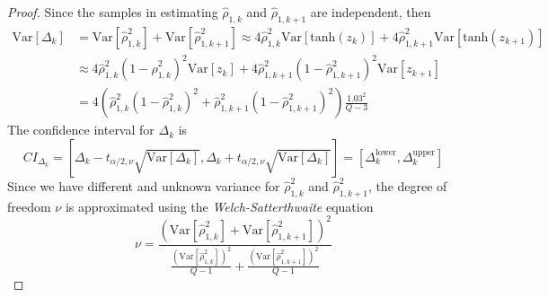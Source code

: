 \begin{proof}
	Since the samples in estimating $\widehat \rho_{1,k}$ and $\widehat\rho_{1,k+1}$ are independent, then 
	\begin{align*}
	\text{Var}\left[\Delta_k\right] &= \text{Var}\left[\widehat \rho_{1,k}^2\right] + \text{Var}\left[\widehat \rho_{1,k+1}^2\right]\approx 4\widehat \rho_{1,k}^2\text{Var}\left[\text{tanh}(z_k)\right]+4\widehat \rho_{1,k+1}^2\text{Var}\left[\text{tanh}(z_{k+1})\right]\\
	&\approx 4\widehat \rho_{1,k}^2\left(1-\widehat \rho_{1,k}^2\right)^2\text{Var}\left[z_k\right]+4\widehat \rho_{1,k+1}^2\left(1-\widehat \rho_{1,k+1}^2\right)^2\text{Var}\left[z_{k+1}\right] \\
	&= 4\left(\widehat \rho_{1,k}^2\left(1-\widehat \rho_{1,k}^2\right)^2+\widehat \rho_{1,k+1}^2\left(1-\widehat \rho_{1,k+1}^2\right)^2\right)\frac{1.03^2}{Q-3}
	\end{align*}
	The confidence interval for $\Delta_k$ is 
	\[
	CI_{\Delta_k} = \left[\Delta_k-t_{\alpha/2, \nu} \sqrt{\text{Var}\left[\Delta_k\right]}, \Delta_k+t_{\alpha/2,\nu} \sqrt{\text{Var}\left[\Delta_k\right]}\right] = \left[\Delta_k^{\text{lower}},\Delta_k^{\text{upper}}\right]
	\]
	Since we have different and  unknown variance for $\widehat \rho_{1,k}^2$ and $\widehat \rho_{1,k+1}^2$, the degree of freedom $\nu$ is approximated using the {\it Welch-Satterthwaite} equation
	\[
	\nu = \frac{\left(\text{Var}\left[\widehat \rho_{1,k}^2\right] + \text{Var}\left[\widehat \rho_{1,k+1}^2\right]\right)^2}{\frac{\left(\text{Var}\left[\widehat \rho_{1,k}^2\right]\right)^2 }{Q-1}+ \frac{\left(\text{Var}\left[\widehat \rho_{1,k+1}^2\right]\right)^2 }{Q-1} }
	\]
	
	
	
	

\end{proof}
